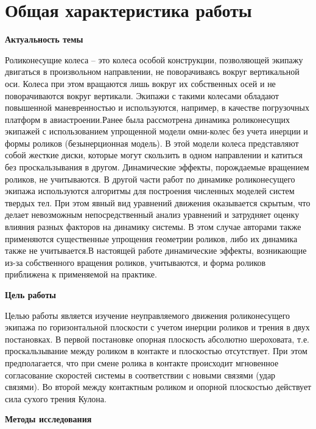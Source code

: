 
\section*{Общая характеристика работы}

\textbf{Актуальность темы}

Роликонесущие колеса – это колеса особой конструкции, позволяющей экипажу двигаться в произвольном направлении, не поворачиваясь вокруг вертикальной оси. Колеса при этом вращаются лишь вокруг их собственных осей и не поворачиваются вокруг вертикали. Экипажи с такими колесами обладают повышенной маневренностью и используются, например, в качестве погрузочных платформ в авиастроении.Ранее была рассмотрена динамика роликонесущих экипажей с использованием упрощенной модели омни-колес без учета инерции и формы роликов (безынерционная модель). В этой модели колеса  представляют собой жесткие диски, которые могут скользить в одном направлении и катиться без проскальзывания в другом. Динамические эффекты, порождаемые вращением роликов, не учитываются. В другой части работ по динамике роликонесущего экипажа используются  алгоритмы для построения численных моделей систем твердых тел. При этом явный вид уравнений движения оказывается скрытым, что делает невозможным непосредственный анализ уравнений и затрудняет оценку влияния разных факторов на динамику системы. В этом случае авторами также применяются существенные упрощения геометрии роликов, либо их динамика также не учитывается.В настоящей работе динамические эффекты, возникающие из-за собственного вращения роликов, учитываются, и форма роликов приближена к применяемой на практике.

\textbf{Цель работы}

Целью работы является изучение неуправляемого движения роликонесущего экипажа по горизонтальной плоскости с учетом инерции роликов и трения в двух постановках. В первой постановке опорная плоскость абсолютно шероховата, т.е. проскальзывание между роликом в контакте и плоскостью отсутствует. При этом предполагается, что при смене ролика в контакте происходит мгновенное согласование скоростей системы в соответствии с новыми связями (удар связями). Во второй между контактным роликом и опорной плоскостью действует сила сухого трения Кулона. 

\textbf{Методы исследования}

